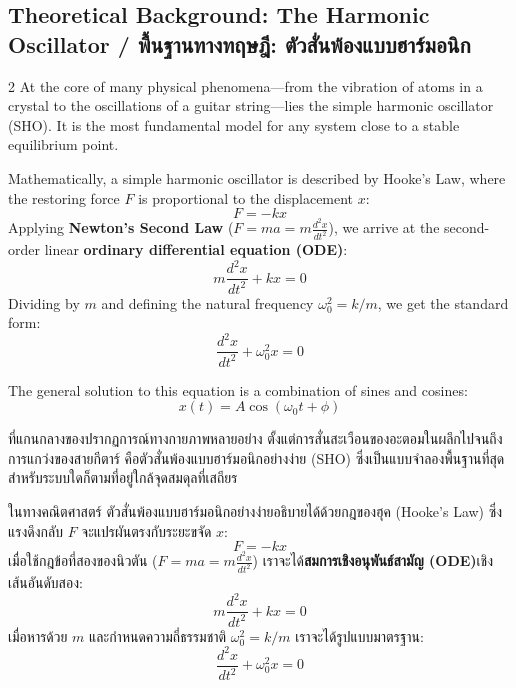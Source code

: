 \subsection{Theoretical Background: The Harmonic Oscillator \quad / \quad \textthai{พื้นฐานทางทฤษฎี: ตัวสั่นพ้องแบบฮาร์มอนิก}}
\begin{paracol}{2}
At the core of many physical phenomena—from the vibration of atoms in a crystal to the oscillations of a guitar string—lies the simple harmonic oscillator (SHO). It is the most fundamental model for any system close to a stable equilibrium point.

Mathematically, a simple harmonic oscillator is described by Hooke's Law, where the restoring force $F$ is proportional to the displacement $x$:
\begin{equation}
    F = -kx
\end{equation}
Applying \textbf{Newton's Second Law} ($F = ma = m \frac{d^2x}{dt^2}$), we arrive at the second-order linear \textbf{ordinary differential equation (ODE)}:
\begin{equation}
    m \frac{d^2x}{dt^2} + kx = 0
\end{equation}
Dividing by $m$ and defining the natural frequency $\omega_0^2 = k/m$, we get the standard form:
\begin{equation}
    \frac{d^2x}{dt^2} + \omega_0^2 x = 0
\end{equation}

The general solution to this equation is a combination of sines and cosines:
\begin{equation}
    x(t) = A \cos(\omega_0 t + \phi)
\end{equation}

\switchcolumn

\begin{thai}
ที่แกนกลางของปรากฏการณ์ทางกายภาพหลายอย่าง ตั้งแต่การสั่นสะเวือนของอะตอมในผลึกไปจนถึงการแกว่งของสายกีตาร์ คือตัวสั่นพ้องแบบฮาร์มอนิกอย่างง่าย (SHO) ซึ่งเป็นแบบจำลองพื้นฐานที่สุดสำหรับระบบใดก็ตามที่อยู่ใกล้จุดสมดุลที่เสถียร

ในทางคณิตศาสตร์ ตัวสั่นพ้องแบบฮาร์มอนิกอย่างง่ายอธิบายได้ด้วยกฎของฮุค (Hooke's Law) ซึ่งแรงดึงกลับ $F$ จะแปรผันตรงกับระยะขจัด $x$:
\begin{equation}
    F = -kx
\end{equation}
เมื่อใช้กฎข้อที่สองของนิวตัน ($F = ma = m \frac{d^2x}{dt^2}$) เราจะได้\textbf{สมการเชิงอนุพันธ์สามัญ (ODE)}เชิงเส้นอันดับสอง:
\begin{equation}
    m \frac{d^2x}{dt^2} + kx = 0
\end{equation}
เมื่อหารด้วย $m$ และกำหนดความถี่ธรรมชาติ $\omega_0^2 = k/m$ เราจะได้รูปแบบมาตรฐาน:
\begin{equation}
    \frac{d^2x}{dt^2} + \omega_0^2 x = 0
\end{equation}


\end{thai}
\end{paracol}
